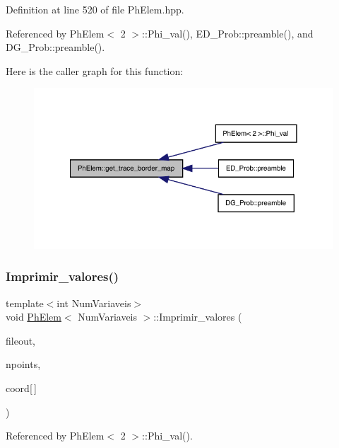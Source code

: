 Definition at line 520 of file Ph\+Elem.\+hpp.



Referenced by Ph\+Elem$<$ 2 $>$\+::\+Phi\+\_\+val(), E\+D\+\_\+\+Prob\+::preamble(), and D\+G\+\_\+\+Prob\+::preamble().

Here is the caller graph for this function\+:
\nopagebreak
\begin{figure}[H]
\begin{center}
\leavevmode
\includegraphics[width=328pt]{classPhElem_a35508e257e1675a912954f83cb4b6a3e_icgraph}
\end{center}
\end{figure}
\mbox{\label{classPhElem_a6f8258d7b66de04cd4d88f2c8af41541}} 
\subsubsection{\texorpdfstring{Imprimir\+\_\+valores()}{Imprimir\_valores()}}
{\footnotesize\ttfamily template$<$int Num\+Variaveis$>$ \\
void \hyperlink{classPhElem}{Ph\+Elem}$<$ Num\+Variaveis $>$\+::Imprimir\+\_\+valores (\begin{DoxyParamCaption}\item[{F\+I\+LE $\ast$}]{fileout,  }\item[{const int \&}]{npoints,  }\item[{const double}]{coord\mbox{[}$\,$\mbox{]} }\end{DoxyParamCaption})}



Referenced by Ph\+Elem$<$ 2 $>$\+::\+Phi\+\_\+val().


